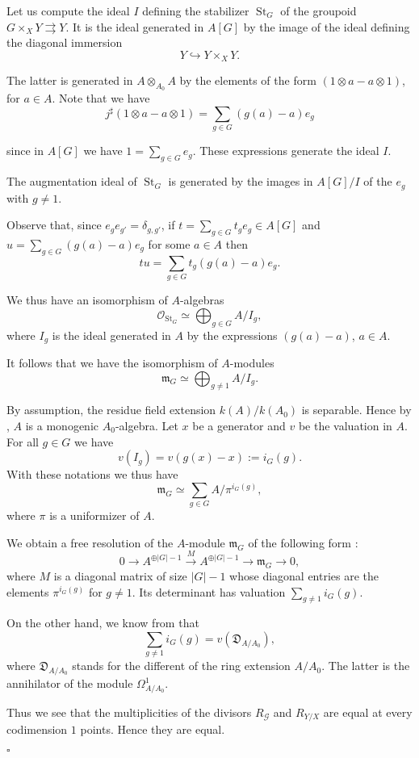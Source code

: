 \documentclass{amsart}
\newenvironment{demo}{{\flushleft \bf Proof~:}}{\hfill $\square$ \vspace{5mm}}
\theoremstyle{definition}
\theoremstyle{remark}
\begin{document}
\begin{demo}
Let us compute the ideal $I$ defining the stabilizer $\operatorname{St}_G$ of the groupoid $G \times_X Y {\rightrightarrows} Y$. It is the ideal generated in $A[G]$ by the image of the ideal defining the diagonal immersion \[ Y {\hookrightarrow} Y \times_X Y. \]

The latter is generated in $A \otimes_{A_0} A$ by the elements of the form $(1 \otimes a - a \otimes 1)$, for $a \in A$. Note that we have \[ j^\sharp(1 \otimes a - a \otimes 1) = \displaystyle\sum_{g \in G} (g(a)-a)e_g  \] 

since in $A[G]$ we have $1 = \displaystyle\sum_{g \in G} e_g$. These expressions generate the ideal $I$.

The augmentation ideal of $\operatorname{St}_G$ is generated by the images in $A[G]/I$ of the $e_g$ with $g \neq 1$.

Observe that, since $e_g e_{g'}=\delta_{g,g'}$, if $t = \displaystyle\sum_{g \in G} t_ge_g \in A[G]$ and $u=\displaystyle\sum_{g \in G } (g(a)-a)e_g$ for some $a \in A $ then \[tu = \displaystyle\sum_{g \in G} t_g(g(a)-a)e_g. \]

We thus have an isomorphism of $A$-algebras \[ {{\mathcal O}}_{\operatorname{St}_G} \simeq \displaystyle\bigoplus_{g \in G} A/I_g, \] where $I_g$ is the ideal generated in $A$ by the expressions $(g(a)-a)$, $a \in A$. 

It follows that we have the isomorphism of $A$-modules \[ {{\mathfrak m}}_G \simeq \displaystyle\bigoplus_{g \neq 1} A/I_g. \] 

By assumption, the residue field extension $k(A)/k(A_0)$ is separable. Hence by \cite[III, \S 6, prop.12]{Se}, $A$ is a monogenic $A_0$-algebra. Let $x$ be a generator and $v$ be the valuation in $A$. For all $g \in G$ we have \[v(I_g) = v(g(x)-x) := i_G(g). \] With these notations we thus have \[ {{\mathfrak m}}_G \simeq \displaystyle\sum_{g \in G} A/ \pi^{i_G(g)}, \] where $\pi$ is a uniformizer of $A$. 

We obtain a free resolution of the $A$-module ${{\mathfrak m}}_G$ of the following form : \[ 0 {\longrightarrow} A^{\oplus \vert G \vert -1} \stackrel{M}{\longrightarrow} A^{\oplus \vert G \vert -1} {\longrightarrow} {{\mathfrak m}}_G {\longrightarrow} 0, \] where $M$ is a diagonal matrix of size $\vert G \vert -1$ whose diagonal entries are the elements $\pi^{i_G(g)}$ for $g \neq 1$. Its determinant has valuation $ \displaystyle\sum_{g \neq 1} i_G(g)$. 

On the other hand, we know from \cite[IV, \S 1, prop.4]{Se} that \[\displaystyle\sum_{g \neq 1} i_G(g) = v( {{\mathfrak D}}_{A/A_0} ), \] where ${{\mathfrak D}}_{A/A_0}$ stands for the different of the ring extension $A/A_0$. The latter is the annihilator of the module $\Omega^1_{A/A_0}$.

Thus we see that the multiplicities of the divisors $R_{{\mathcal G}}$ and $R_{Y/X}$ are equal at every codimension $1$ points. Hence they are equal.

\end{demo}
\end{document}
